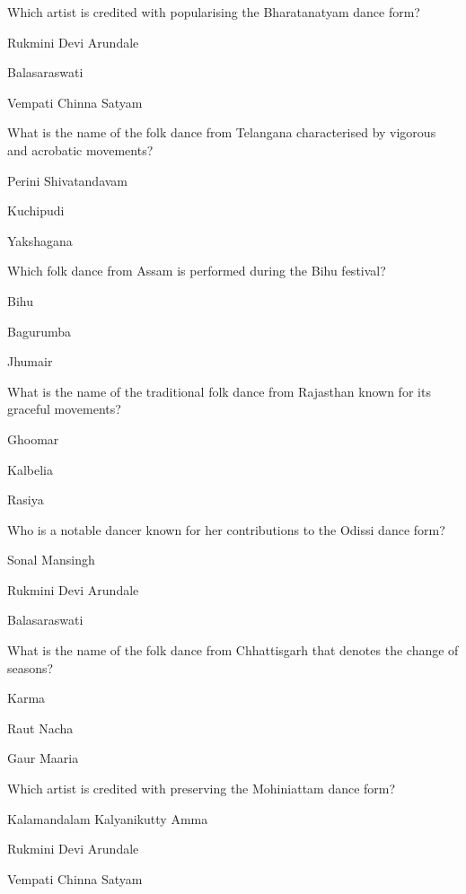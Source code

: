 \begin{enhancedmcq}{Which artist is credited with popularising the Bharatanatyam dance form?}
\item Rukmini Devi Arundale
\item Balasaraswati
\item Vempati Chinna Satyam

\end{enhancedmcq}
\begin{enhancedmcq}{What is the name of the folk dance from Telangana characterised by vigorous and acrobatic movements?}
\item Perini Shivatandavam
\item Kuchipudi
\item Yakshagana

\end{enhancedmcq}
\begin{enhancedmcq}{Which folk dance from Assam is performed during the Bihu festival?}
\item Bihu
\item Bagurumba
\item Jhumair

\end{enhancedmcq}
\begin{enhancedmcq}{What is the name of the traditional folk dance from Rajasthan known for its graceful movements?}
\item Ghoomar
\item Kalbelia
\item Rasiya

\end{enhancedmcq}
\begin{enhancedmcq}{Who is a notable dancer known for her contributions to the Odissi dance form?}
\item Sonal Mansingh
\item Rukmini Devi Arundale
\item Balasaraswati

\end{enhancedmcq}
\begin{enhancedmcq}{What is the name of the folk dance from Chhattisgarh that denotes the change of seasons?}
\item Karma
\item Raut Nacha
\item Gaur Maaria

\end{enhancedmcq}
\begin{enhancedmcq}{Which artist is credited with preserving the Mohiniattam dance form?}
\item Kalamandalam Kalyanikutty Amma
\item Rukmini Devi Arundale
\item Vempati Chinna Satyam

\end{enhancedmcq}
